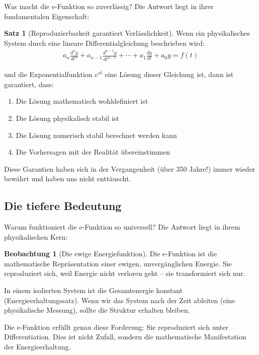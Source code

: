 \documentclass[a4paper,12pt,twoside]{report}
\theoremstyle{definition}
\newtheorem{satz}{Satz}
\newtheorem{beobachtung}{Beobachtung}
\begin{document}
Was macht die e-Funktion so zuverlässig? Die Antwort liegt in ihrer fundamentalen Eigenschaft:

\begin{satz}[Reproduzierbarkeit garantiert Verlässlichkeit]
	Wenn ein physikalisches System durch eine lineare Differentialgleichung beschrieben wird:
	\begin{align}
		a_n \frac{d^n y}{dt^n} + a_{n-1} \frac{d^{n-1} y}{dt^{n-1}} + \cdots + a_1 \frac{dy}{dt} + a_0 y = f(t)
	\end{align}
	
	und die Exponentialfunktion $e^{st}$ eine Lösung dieser Gleichung ist, dann ist garantiert, dass:
	
	\begin{enumerate}
		\item Die Lösung mathematisch wohldefiniert ist
		\item Die Lösung physikalisch stabil ist
		\item Die Lösung numerisch stabil berechnet werden kann
		\item Die Vorhersagen mit der Realität übereinstimmen
	\end{enumerate}
	
	Diese Garantien haben sich in der Vergangenheit (über 350 Jahre!) immer wieder bewährt und haben uns nicht enttäuscht.
\end{satz}

\subsection{Die tiefere Bedeutung}

Warum funktioniert die e-Funktion so universell? Die Antwort liegt in ihrem physikalischen Kern:

\begin{beobachtung}[Die ewige Energiefunktion]
	Die e-Funktion ist die mathematische Repräsentation einer ewigen, unvergänglichen Energie. Sie reproduziert sich, weil Energie nicht verloren geht -- sie transformiert sich nur.
	
	In einem isolierten System ist die Gesamtenergie konstant (Energieerhaltungssatz). Wenn wir das System nach der Zeit ableiten (eine physikalische Messung), sollte die Struktur erhalten bleiben.
	
	Die e-Funktion erfüllt genau diese Forderung: Sie reproduziert sich unter Differentiation. Dies ist nicht Zufall, sondern die mathematische Manifestation der Energieerhaltung.
\end{beobachtung}
\end{document}
